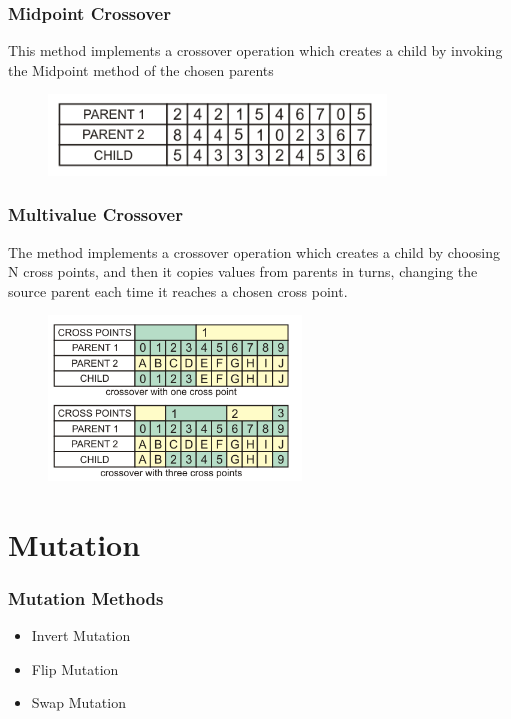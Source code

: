 \documentclass{beamer}%
\begin{document}
\begin{frame}
\frametitle{Midpoint Crossover}
This method implements a crossover operation which creates a child by invoking the Midpoint method of the chosen parents
\begin{figure}
\centering
  \includegraphics[width=0.8\textwidth]{images/5.png}
\end{figure}

\end{frame}



\begin{frame}
\frametitle{Multivalue Crossover}
The method implements a crossover operation which creates a child by choosing N cross points, and then it copies values from parents in turns, changing the source parent each time it reaches a chosen cross point.\\

\begin{figure}
\centering
  \includegraphics[width=0.6\textwidth]{images/6.png}
\end{figure}

\end{frame}





\section{Mutation}

\begin{frame}
\frametitle{Mutation Methods}
\begin{itemize}
\item Invert Mutation
\item Flip Mutation
\item Swap Mutation
\end{itemize}
\end{frame}
\end{document}
